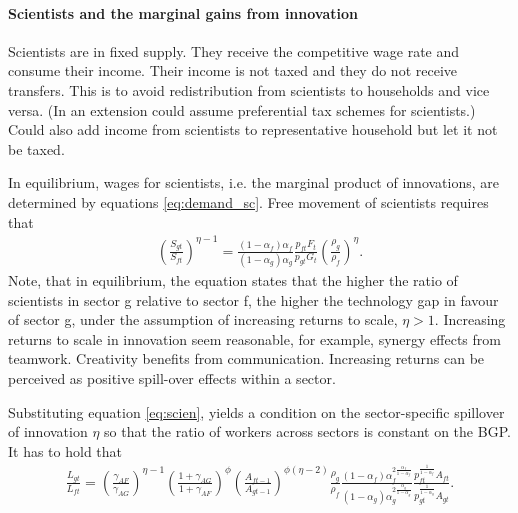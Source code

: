 \paragraph{Scientists and the marginal gains from innovation}
Scientists are in fixed supply. They receive the competitive wage rate and consume their income. Their income is not taxed and they do not receive transfers. This is to avoid redistribution from scientists to households and vice versa.  (In an extension could assume preferential tax schemes for scientists.) Could also add income from scientists to representative household but let it not be taxed. 


In equilibrium, wages for scientists, i.e. the marginal product of innovations, are determined by equations \ref{eq:demand_sc}. 
Free movement of scientists requires that
\begin{align}
\left(\frac{S_{gt}}{S_{ft}}\right)^{\eta-1}= \frac{(1-\alpha_f)\alpha_f}{(1-\alpha_g)\alpha_g}\frac{p_{ft}F_t}{p_{gt}G_t}\left(\frac{\rho_g}{\rho_f}\right)^\eta.
\end{align}
Note, that in equilibrium, the equation states that the higher the ratio of scientists in sector g relative to sector f, the higher the technology gap in favour of sector g, under the assumption of increasing returns to scale, $\eta>1$. Increasing returns to scale in innovation seem reasonable, for example, synergy effects from teamwork. Creativity benefits from communication. Increasing returns can be perceived as positive spill-over effects within a sector. 


Substituting equation \ref{eq:scien}, yields a condition on the sector-specific spillover of innovation $\eta$ so that the ratio of workers across sectors is constant on the BGP.
It has to hold that
\begin{align}
\frac{L_{gt}}{L_{ft}}= \left(\frac{\gamma_{AF}}{\gamma_{AG}}\right)^{\eta-1}\left(\frac{1+\gamma_{AG}}{1+\gamma_{AF}}\right)^\phi \left(\frac{A_{ft-1}}{A_{gt-1}}\right)^{\phi(\eta-2)}\frac{\rho_g}{\rho_f}\frac{(1-\alpha_f)\alpha_f^{2\frac{\alpha_f}{1-\alpha_f}}}{(1-\alpha_g)\alpha_g^{2\frac{\alpha_g}{1-\alpha_g}}}\frac{p_{ft}^\frac{1}{1-\alpha_f}A_{ft}}{p_{gt}^\frac{1}{1-\alpha_g}A_{gt}}.
\end{align}

